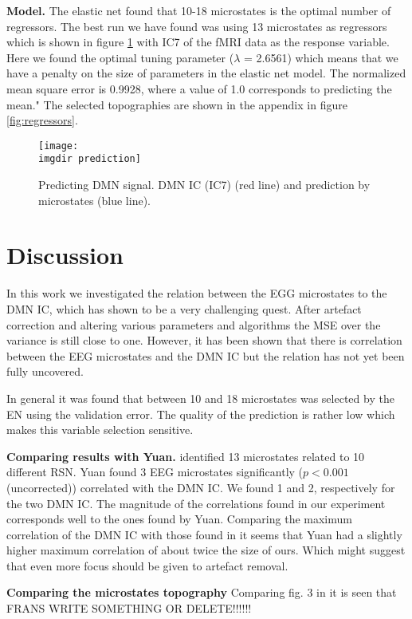 \documentclass{article}
\newcommand{\imgdir}{Images/} %
\begin{document}
\textbf{Model.} The elastic net found that 10-18 microstates is the optimal number of regressors.  The best run we have found was using 13 microstates as regressors which is shown in figure \ref{fig:pred} with IC7 of the fMRI data as the response variable. Here we found the optimal tuning parameter ($\lambda$ = 2.6561) which means that we have a penalty on the size of parameters in the elastic net model. The normalized mean square error is 0.9928, where a value of 1.0 corresponds to predicting the mean."
The selected topographies are shown in the appendix in figure \ref{fig:regressors}.

\begin{figure}[!ht]
    \centering
    \texttt{[image: \\imgdir prediction]}
    \caption{Predicting DMN signal. DMN IC (IC7) (red line) and prediction by microstates (blue line).}
    \label{fig:pred}
\end{figure}

\section{Discussion}
In this work we investigated the relation between the EGG microstates to the DMN IC, which has shown to be a very challenging quest. After artefact correction and altering various parameters and algorithms the MSE over the variance is still close to one. However, it has been shown that there is correlation between the EEG microstates and the DMN IC but the relation has not yet been fully uncovered.

In general it was found that between 10 and 18 microstates was selected by the EN using the validation error. The quality of the prediction is rather low which makes this variable selection sensitive.

\textbf{Comparing results with Yuan.} \cite{Yuan20122062} identified 13 microstates related to 10 different RSN. Yuan found 3 EEG microstates significantly ($p<0.001$ (uncorrected)) correlated with the DMN IC. We found 1 and 2, respectively for the two DMN IC.
The magnitude of the correlations found in our experiment corresponds well to the ones found by Yuan. Comparing the maximum correlation of the DMN IC with those found in \cite{Yuan20122062} it seems that Yuan had a slightly higher maximum correlation of about twice the size of ours. Which might suggest that even more focus should be given to artefact removal.

\textbf{Comparing the microstates topography} 
Comparing fig. 3 in \cite{Yuan20122062} it is seen that FRANS WRITE SOMETHING OR DELETE!!!!!!
\end{document}
